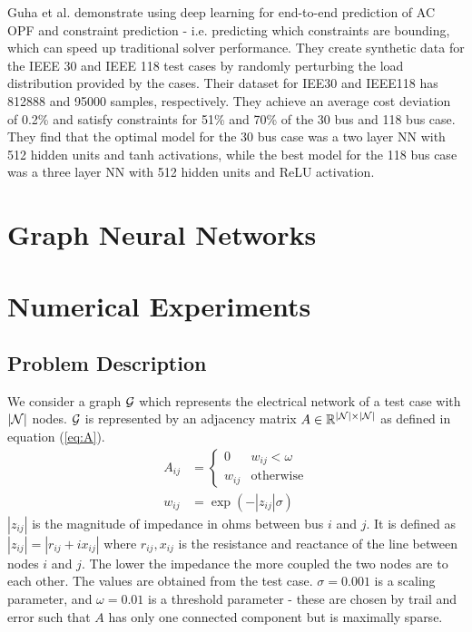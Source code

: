 \documentclass[conference,9pt]{IEEEtran}
\begin{document}
	Guha et al. \cite{guha} demonstrate using deep learning for end-to-end prediction of AC OPF and constraint prediction - i.e. predicting which constraints are bounding, which can speed up traditional solver performance.  They create synthetic data for the IEEE 30 and IEEE 118 test cases by randomly perturbing the load distribution provided by the cases. Their dataset for IEE30 and IEEE118 has 812888 and 95000 samples, respectively. They achieve an average cost deviation of 0.2\% and satisfy constraints for 51\% and 70\% of the 30 bus and 118 bus case. They find that the optimal model for the 30 bus case was a two layer NN with 512 hidden units and tanh activations, while the best model for the 118 bus case was a three layer NN with 512 hidden units and ReLU activation.
	
	
	\section{Graph Neural Networks}
	
	\section{Numerical Experiments}
	
	\subsection{Problem Description}
	We consider a graph ${\mathcal G}$ which represents the electrical network of a test case with $|{\mathcal N}|$ nodes. ${\mathcal G}$ is represented by an adjacency matrix $A \in \mathbb{R}^{|{\mathcal N}| \times |{\mathcal N}|}$ as defined in equation (\ref{eq:A}).
	\begin{align}
		A_{ij} &= 
			\begin{cases}
				0 & w_{ij} < \omega\\
				w_{ij} & \text{otherwise}
			\end{cases} \label{eq:A}\\
		w_{ij} &= \exp(-|z_{ij}| \sigma)
	\end{align}
	$|z_{ij}|$ is the magnitude of impedance in ohms between bus $i$ and $j$. It is defined as $|z_{ij}| = |r_{ij} + i x_{ij}|$ where $r_{ij}, x_{ij}$ is the resistance and reactance of the line between nodes $i$ and $j$. The lower the impedance the more coupled the two nodes are to each other. The values are obtained from the test case. $\sigma=0.001$ is a scaling parameter, and $\omega=0.01$ is a threshold parameter - these are chosen by trail and error such that $A$ has only one connected component but is maximally sparse. 
	
\end{document}
